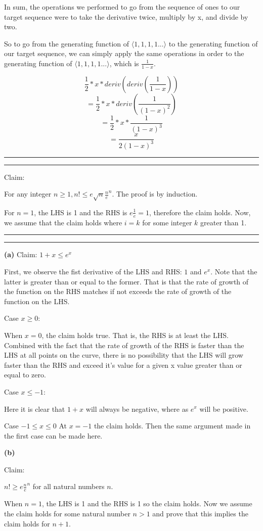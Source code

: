 \documentclass[11pt,letterpaper]{article}
\newcommand{\question}[2] {\vspace{.25in} \hrule\vspace{0.5em}
\noindent{\bf #1: #2} \vspace{0.5em}
\hrule \vspace{.10in}}
\begin{document}
In sum, the operations we performed to go from the sequence of ones to our target sequence
were to take the derivative twice, multiply by x, and divide by two.

So to go from the generating function of $\langle 1, 1, 1, 1 ... \rangle$ to the generating function of our target sequence,
we can simply apply the same operations in order to the generating function of $\langle 1, 1, 1, 1 ... \rangle$, which is $\frac{1}{1-x}$.

$$\frac{1}{2} * x * deriv( deriv( \frac{1}{1-x} ) ) $$
$$=\frac{1}{2} * x * deriv( \frac{1}{(1-x)^2} ) $$
$$=\frac{1}{2} * x * \frac{1}{(1-x)^3} $$
$$=\frac{x}{2(1-x)^3} $$


\question{3}{3}
Claim:

For any integer $n \geq 1, n! \leq e \sqrt{n} \frac{n}{e}^n$. The proof is by induction.

For $ n = 1 $, the LHS is 1 and the RHS is $e \frac{1}{e} = 1$, therefore the claim holds.
Now, we assume that the claim holds where $i=k$ for some integer $k$ greater than 1.



\question{4}{4}

\textbf{(a)}
Claim:
$1 + x \leq e^x$

First, we observe the fist derivative of the LHS and RHS: $1$ and $e^x$. Note that the latter is greater than or equal to the former.
That is that the rate of growth of the function on the RHS matches if not exceeds the rate of growth of the function on the LHS.

Case $x \geq 0$:

When $x=0$, the claim holds true. That is, the RHS is at least the LHS. Combined with the fact that
the rate of growth of the RHS is faster than the LHS at all points on the curve, there is no possibility
that the LHS will grow faster than the RHS and exceed it's value for a given x value greater than or equal to zero.

Case $x \leq -1$:

Here it is clear that $1+x$ will always be negative, where as $e^x$ will be positive.

Case $-1 \leq x \leq 0$
At $x=-1$ the claim holds. Then the same argument made in the first case can be made here.

\textbf{(b)}

Claim:

$n! \geq e \frac{n}{e}^n $ for all natural numbers $n$.

When $n=1$, the LHS is 1 and the RHS is 1 so the claim holds.
Now we assume the claim holds for some natural number $n > 1$ and prove that this implies the claim holds for $n+1$.
\end{document}
